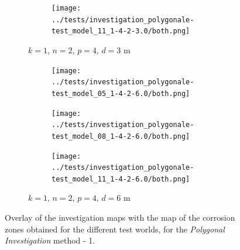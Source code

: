 \begin{theappendices}
\begin{figure}[H]
\begin{subfigure}[t]{\linewidth}
\begin{subfigure}[t]{0.2\linewidth}
					\texttt{[image: ../tests/investigation\_polygonale-test\_model\_11\_1-4-2-3.0/both.png]}
				\end{subfigure}
				\caption{$k = 1$, $n = 2$, $p = 4$, $d = 3$ m}
			\end{subfigure}
			\hfill
			\begin{subfigure}[t]{\linewidth}
				\centering
				\begin{subfigure}[t]{0.2\linewidth}
					\texttt{[image: ../tests/investigation\_polygonale-test\_model\_05\_1-4-2-6.0/both.png]}
				\end{subfigure}
				\hfill
				\begin{subfigure}[t]{0.2\linewidth}
					\texttt{[image: ../tests/investigation\_polygonale-test\_model\_08\_1-4-2-6.0/both.png]}
				\end{subfigure}
				\hfill
				\begin{subfigure}[t]{0.2\linewidth}
					\texttt{[image: ../tests/investigation\_polygonale-test\_model\_11\_1-4-2-6.0/both.png]}
				\end{subfigure}
				\caption{$k = 1$, $n = 2$, $p = 4$, $d = 6$ m}
			\end{subfigure}
			\caption{Overlay of the investigation maps with the map of the corrosion zones obtained for the different test worlds, for the \textit{Polygonal Investigation} method - 1.}
			\label{fig:investigation_polygonale_resultats}
		\end{figure}


\end{theappendices}
